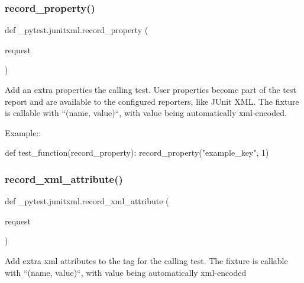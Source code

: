 \subsubsection{\texorpdfstring{record\+\_\+property()}{record\_property()}}
{\footnotesize\ttfamily def \+\_\+pytest.\+junitxml.\+record\+\_\+property (\begin{DoxyParamCaption}\item[{}]{request }\end{DoxyParamCaption})}

\begin{DoxyVerb}Add an extra properties the calling test.
User properties become part of the test report and are available to the
configured reporters, like JUnit XML.
The fixture is callable with ``(name, value)``, with value being automatically
xml-encoded.

Example::

    def test_function(record_property):
        record_property("example_key", 1)
\end{DoxyVerb}
 \mbox{\label{namespace__pytest_1_1junitxml_a4cff71db329d352c81f33eba5cdff813}} 
\subsubsection{\texorpdfstring{record\+\_\+xml\+\_\+attribute()}{record\_xml\_attribute()}}
{\footnotesize\ttfamily def \+\_\+pytest.\+junitxml.\+record\+\_\+xml\+\_\+attribute (\begin{DoxyParamCaption}\item[{}]{request }\end{DoxyParamCaption})}

\begin{DoxyVerb}Add extra xml attributes to the tag for the calling test.
The fixture is callable with ``(name, value)``, with value being
automatically xml-encoded
\end{DoxyVerb}
 \mbox{\label{namespace__pytest_1_1junitxml_ac77a0ad7f33416d08a6654bbdb865c11}} 
